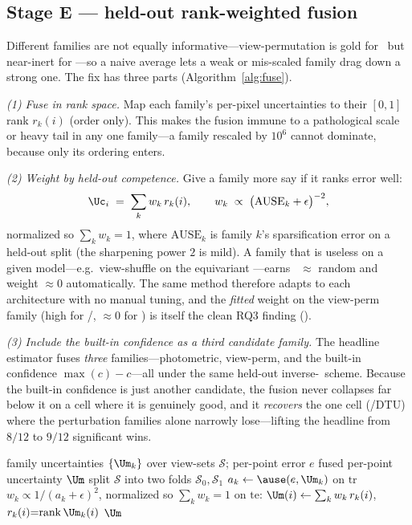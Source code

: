 \subsection{Stage E --- held-out rank-weighted fusion}
\label{sec:method-fuse}

Different families are not equally informative---view-permutation is gold for \vggt\ but near-inert
for \pii---so a naive average lets a weak or mis-scaled family drag down a strong one. The fix has
three parts (Algorithm~\ref{alg:fuse}).

\emph{(1) Fuse in rank space.} Map each family's per-pixel uncertainties to their $[0,1]$ rank
$r_k(i)$ (order only). This makes the fusion immune to a pathological scale or heavy tail in any one
family---a family rescaled by $10^6$ cannot dominate, because only its ordering enters.

\emph{(2) Weight by held-out competence.} Give a family more say if it ranks error well:
\begin{equation}
\Uc_i \;=\; \sum_k w_k\, r_k(i), \qquad
w_k \;\propto\; \big(\mathrm{AUSE}_k + \epsilon\big)^{-2},
\label{eq:fusion}
\end{equation}
normalized so $\sum_k w_k = 1$, where $\mathrm{AUSE}_k$ is family $k$'s sparsification error on a
held-out split (the sharpening power $2$ is mild). A family that is useless on a given model---e.g.\
view-shuffle on the equivariant \pii---earns \ause\ $\approx$ random and weight $\approx 0$
automatically. The same method therefore adapts to each architecture with no manual tuning, and the
\emph{fitted} weight on the view-perm family (high for \vggt/\mastr, $\approx 0$ for \pii) is itself
the clean RQ3 finding (\Cref{sec:exp-arch}).

\emph{(3) Include the built-in confidence as a third candidate family.} The headline estimator fuses
\emph{three} families---photometric, view-perm, and the built-in confidence $\max(c)-c$---all under
the same held-out inverse-\ause\ scheme. Because the built-in confidence is just another candidate,
the fusion never collapses far below it on a cell where it is genuinely good, and it \emph{recovers}
the one cell (\pii/DTU) where the perturbation families alone narrowly lose---lifting the headline
from $8/12$ to $9/12$ significant wins.

\begin{algorithm*}[t]
\caption{Held-out inverse-\ause\ rank fusion}
\label{alg:fuse}
\small
\begin{algorithmic}[1]
\Require family uncertainties $\{\Um_k\}$ over view-sets $\mathcal{S}$; per-point error $e$
\Ensure fused per-point uncertainty $\Um$
\State split $\mathcal{S}$ into two folds $\mathcal{S}_0, \mathcal{S}_1$
  \For{each family $k$}
    \State $a_k \gets \ause(e, \Um_k)$ on $\mathrm{tr}$ 
  \EndFor
  \State $w_k \propto 1/(a_k + \epsilon)^2$, normalized so $\textstyle\sum_k w_k = 1$
  \State on $\mathrm{te}$: $\Um(i) \gets \sum_k w_k\, r_k(i)$, \; $r_k(i){=}\mathrm{rank}\,\Um_k(i)$
\EndFor
\State \Return $\Um$
\end{algorithmic}
\end{algorithm*}

